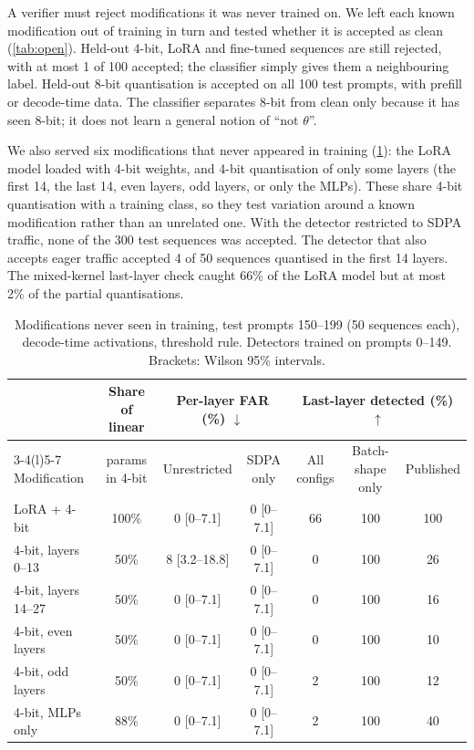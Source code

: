 \documentclass[10pt,twocolumn]{article}
\newcommand{\up}{$\uparrow$}
\newcommand{\down}{$\downarrow$}
\newcommand{\ci}[2]{{\scriptsize[#1--#2]}}
\begin{document}
A verifier must reject modifications it was never trained on.
We left each known modification out of training in turn and tested whether it is accepted as clean (\cref{tab:open}).
Held-out 4-bit, LoRA and fine-tuned sequences are still rejected, with at most 1 of 100 accepted; the classifier simply gives them a neighbouring label.
Held-out 8-bit quantisation is accepted on all 100 test prompts, with prefill or decode-time data.
The classifier separates 8-bit from clean only because it has seen 8-bit; it does not learn a general notion of ``not $\theta$''.

We also served six modifications that never appeared in training (\cref{tab:newmods}): the LoRA model loaded with 4-bit weights, and 4-bit quantisation of only some layers (the first 14, the last 14, even layers, odd layers, or only the MLPs).
These share 4-bit quantisation with a training class, so they test variation around a known modification rather than an unrelated one.
With the detector restricted to SDPA traffic, none of the 300 test sequences was accepted.
The detector that also accepts eager traffic accepted 4 of 50 sequences quantised in the first 14 layers.
The mixed-kernel last-layer check caught 66\% of the LoRA model but at most 2\% of the partial quantisations.

\begin{table}[!t]
\centering
\small
\caption{Modifications never seen in training, test prompts 150--199 (50 sequences each), decode-time activations, threshold rule. Detectors trained on prompts 0--149. Brackets: Wilson 95\% intervals.}
\label{tab:newmods}
\begin{tabular}{@{}lcccccc@{}}
\toprule
 & Share of linear & \multicolumn{2}{c}{Per-layer FAR (\%) \down} & \multicolumn{3}{c}{Last-layer detected (\%) \up} \\
\cmidrule(lr){3-4}\cmidrule(l){5-7}
Modification & params in 4-bit & Unrestricted & SDPA only & All configs & Batch-shape only & Published \\
\midrule
LoRA + 4-bit          & 100\% & 0 \ci{0}{7.1} & 0 \ci{0}{7.1} & 66 & 100 & 100 \\
4-bit, layers 0--13   & 50\%  & 8 \ci{3.2}{18.8} & 0 \ci{0}{7.1} & 0 & 100 & 26 \\
4-bit, layers 14--27  & 50\%  & 0 \ci{0}{7.1} & 0 \ci{0}{7.1} & 0 & 100 & 16 \\
4-bit, even layers    & 50\%  & 0 \ci{0}{7.1} & 0 \ci{0}{7.1} & 0 & 100 & 10 \\
4-bit, odd layers     & 50\%  & 0 \ci{0}{7.1} & 0 \ci{0}{7.1} & 2 & 100 & 12 \\
4-bit, MLPs only      & 88\%  & 0 \ci{0}{7.1} & 0 \ci{0}{7.1} & 2 & 100 & 40 \\
\bottomrule
\end{tabular}
\end{table}
\end{document}
